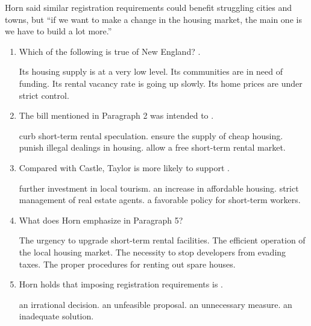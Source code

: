 Horn said similar registration requirements could benefit struggling cities and towns, but ``if we want to make a change in the housing market, the main one is we have to build a lot more.''

\begin{enumerate}[resume]

\item

Which of the following is true of New England? \lineread.

\fourchoices
{Its housing supply is at a very low level.}
{Its communities are in need of funding.}
{Its rental vacancy rate is going up slowly.}
{Its home prices are under strict control.}

\item

The bill mentioned in Paragraph 2 was intended to \lineread.

\fourchoices
{curb short-term rental speculation.}
{ensure the supply of cheap housing.}
{punish illegal dealings in housing.}
{allow a free short-term rental market.}

\item

Compared with Castle, Taylor is more likely to support \lineread.

\fourchoices
{further investment in local tourism.}
{an increase in affordable housing.}
{strict management of real estate agents.}
{a favorable policy for short-term workers.}

\item

What does Horn emphasize in Paragraph 5?

\fourchoices
{The urgency to upgrade short-term rental facilities.}
{The efficient operation of the local housing market.}
{The necessity to stop developers from evading taxes.}
{The proper procedures for renting out spare houses.}

\item

Horn holds that imposing registration requirements is \lineread.

\fourchoices
{an irrational decision.}
{an unfeasible proposal.}
{an unnecessary measure.}
{an inadequate solution.}

\end{enumerate}


